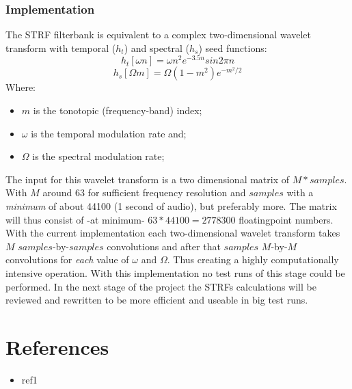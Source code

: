 \documentclass{article}
\begin{document}
\subsubsection{Implementation}
The STRF filterbank is equivalent to a complex two-dimensional wavelet transform with temporal ($h_{t}$) and spectral ($h_{s}$) seed functions:
\begin{equation*}
	h_{t}[\omega n] = \omega n^{2}e^{-3.5n}sin{2\pi n}
\end{equation*}
\begin{equation*}
	h_{s}[\Omega m] = \Omega (1 - m^{2})e^{-m^{2} / 2}
\end{equation*}
Where:
\begin{itemize}
	\item $m$ is the tonotopic (frequency-band) index;
	\item $\omega$ is the temporal modulation rate and;
	\item $\Omega$ is the spectral modulation rate;
\end{itemize}

The input for this wavelet transform is a two dimensional matrix of $M * samples$. With $M$ around 63 for sufficient frequency resolution and $samples$ with a \emph{minimum} of about 44100 (1 second of audio), but preferably more. The matrix will thus consist of -at minimum- $63 * 44100 = 2778300$ floatingpoint numbers. With the current implementation each two-dimensional wavelet transform takes $M$ $samples$-by-$samples$ convolutions and after that $samples$ $M$-by-$M$ convolutions for \emph{each} value of $\omega$ and $\Omega$.
	Thus creating  a highly computationally intensive operation. With this implementation no test runs of this stage could be performed. In the next stage of the project the STRFs calculations will be reviewed and rewritten to be more efficient and useable in big test runs.

\section{References}
\begin{itemize}
	\item[] ref1
\end{itemize}


\end{document}
